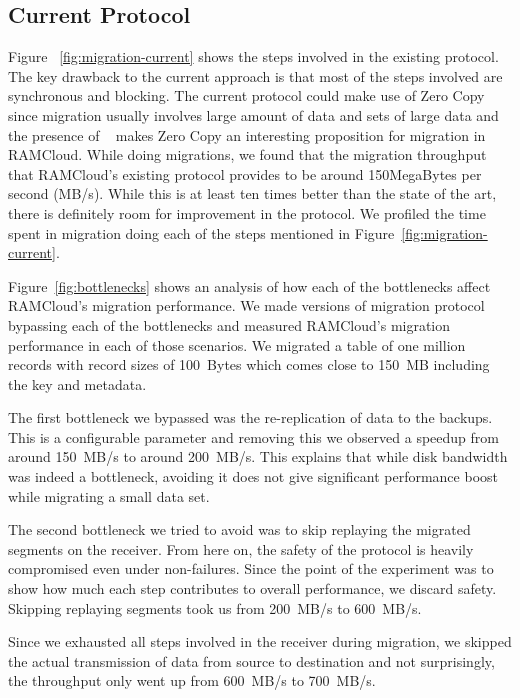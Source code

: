 \subsection{Current Protocol}
Figure ~\ref{fig:migration-current} shows the steps involved in the existing protocol. The key drawback to the current approach is that 
most of the steps involved are synchronous and blocking. The current protocol could make use of Zero Copy since migration usually involves 
large amount of data and sets of large data and the presence of ~\cite{ramcloudtx} makes Zero Copy an interesting proposition 
for migration in RAMCloud. While doing migrations, we found that the migration throughput that RAMCloud's existing protocol provides to 
be around 150MegaBytes per second (MB/s). While this is at least ten times better than the state of the art, there is definitely room for improvement in the protocol.
We profiled the time spent in migration doing each of the steps mentioned in Figure~\ref{fig:migration-current}.



Figure~\ref{fig:bottlenecks} shows an analysis of how each of the bottlenecks affect RAMCloud's migration performance. We made versions of migration 
protocol bypassing each of the bottlenecks and measured RAMCloud's migration performance in each of those scenarios. We migrated a table of one million 
records with record sizes of 100~Bytes which comes close to 150~MB including the key and metadata.

The first bottleneck we bypassed was the re-replication of data to the backups. This is a configurable parameter and removing this we observed a speedup from around 150~MB/s to around 
200~MB/s. This explains that while disk bandwidth was indeed a bottleneck, avoiding it does not give significant performance boost while migrating a small data set.

The second bottleneck we tried to avoid was to skip replaying the migrated segments on the receiver. From here on, the safety of the protocol is heavily compromised even under 
 non-failures. Since the point of the experiment was to show how much each step contributes to overall performance, we discard safety. Skipping replaying segments took us from 
 200~MB/s to 600~MB/s. 

Since we exhausted all steps involved in the receiver during migration, we skipped the actual transmission of data from source to destination and not surprisingly, the throughput 
only went up from 600~MB/s to 700~MB/s. 


